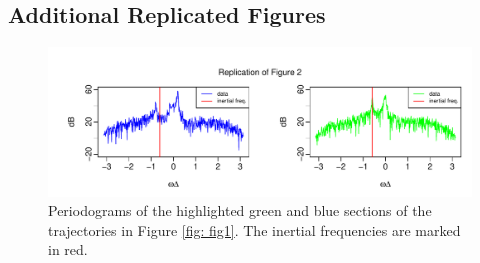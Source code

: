 \documentclass{stat572Style}
\begin{document}
\subsection{Additional Replicated Figures}

\begin{figure}[h!]
  \centering
    \includegraphics[width=\textwidth]{ReplicatedFigures/fig2.pdf}
        \caption{Periodograms of the highlighted green and blue sections of the trajectories in Figure \ref{fig: fig1}. The inertial frequencies are marked in red. }
        	\label{fig: fig2}
\end{figure}
\end{document}
